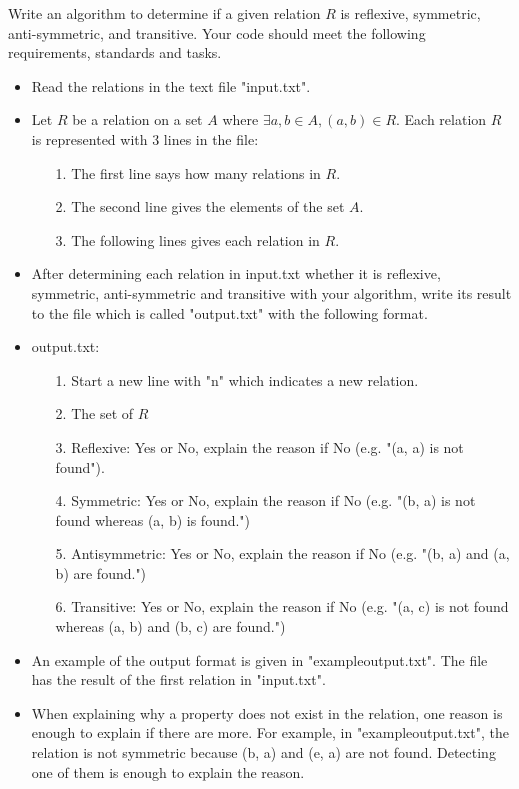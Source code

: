 \documentclass[a4 paper]{article}
\numberwithin{equation}{section}
\newcommand{\0}{\mathbf{0}}
\begin{document}
Write an algorithm to determine if a given relation $R$ is reflexive, symmetric, anti-symmetric, and transitive. Your code should meet the following requirements, standards and tasks.

\begin{itemize}
	\item Read the relations in the text file "input.txt".
	\item Let $R$ be a relation on a set $A$ where $\exists a,b \in A, (a,b) \in R$. Each relation $R$ is represented with 3 lines in the file:
	\begin{itemize}
		\item [1.] The first line says how many relations in $R$.
		\item[2.] The second line gives the elements of the set $A$.
		\item[3.] The following lines gives each relation in $R$.
	\end{itemize}
	\item After determining each relation in input.txt whether it is reflexive, symmetric, anti-symmetric and transitive with your algorithm, write its result to the file which is called "output.txt" with the following format.
	\item output.txt:
	\begin{itemize}
		\item[1.] Start a new line with "n" which indicates a new relation.
		\item[2.] The set of $R$
		\item[3.] Reflexive: Yes or No, explain the reason if No (e.g. "(a, a) is not found").
		\item[4.] Symmetric: Yes or No, explain the reason if No (e.g. "(b, a) is not found whereas (a, b) is found.")
		\item[5.] Antisymmetric: Yes or No, explain the reason if No (e.g. "(b, a) and (a, b) are found.")
		\item[6.] Transitive: Yes or No, explain the reason if No (e.g. "(a, c) is not found whereas (a, b) and (b, c) are found.")
	\end{itemize}
	\item An example of the output format is given in "exampleoutput.txt". The file has the result of the first relation in "input.txt".
	\item When explaining why a property does not exist in the relation, one reason is enough to explain if there are more. For example, in "exampleoutput.txt", the relation is not symmetric because (b, a) and (e, a) are not found. Detecting one of them is enough to explain the reason.

\end{itemize}
\end{document}
